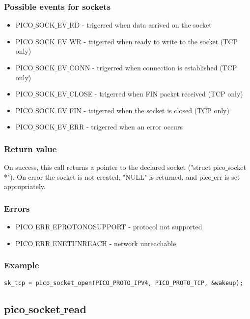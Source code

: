 \subsubsection*{Possible events for sockets}
\begin{itemize}
\item PICO$\_$SOCK$\_$EV$\_$RD - trigerred when data arrived on the socket
\item PICO$\_$SOCK$\_$EV$\_$WR - trigerred when ready to write to the socket (TCP only)
\item PICO$\_$SOCK$\_$EV$\_$CONN - trigerred when connection is established (TCP only)
\item PICO$\_$SOCK$\_$EV$\_$CLOSE - trigerred when FIN packet received (TCP only)
\item PICO$\_$SOCK$\_$EV$\_$FIN - trigerred when the socket is closed (TCP only)
\item PICO$\_$SOCK$\_$EV$\_$ERR - trigerred when an error occurs
\end{itemize}

\subsubsection*{Return value}
On success, this call returns a pointer to the declared socket ("struct pico$\_$socket *").
On error the socket is not created, "NULL" is returned, and pico$\_$err is set appropriately.

\subsubsection*{Errors}
\begin{itemize}
\item PICO$\_$ERR$\_$EPROTONOSUPPORT - protocol not supported
\item PICO$\_$ERR$\_$ENETUNREACH - network unreachable 
\end{itemize}

\subsubsection*{Example}
\begin{verbatim}
sk_tcp = pico_socket_open(PICO_PROTO_IPV4, PICO_PROTO_TCP, &wakeup);
\end{verbatim}


\subsection{pico$\_$socket$\_$read}

